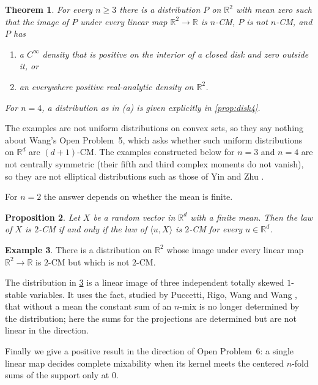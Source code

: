 \documentclass[11pt]{article}
\newtheorem{theorem}{Theorem}[section]
\newtheorem{proposition}[theorem]{Proposition}
\theoremstyle{definition}
\newtheorem{example}[theorem]{Example}
\theoremstyle{remark}
\newcommand{\R}{\mathbb{R}}
\begin{document}
\begin{theorem}\label{thm:regular}
For every $n\ge 3$ there is a distribution $P$ on $\R^2$ with mean zero such that the image of $P$ under every linear
map $\R^2\to\R$ is $n$-CM, $P$ is not $n$-CM, and $P$ has
\begin{enumerate}[label=(\alph*)]
\item a $C^\infty$ density that is positive on the interior of a closed disk and zero outside it, or
\item an everywhere positive real-analytic density on $\R^2$.
\end{enumerate}
For $n=4$, a distribution as in (a) is given explicitly in \cref{prop:disk4}.
\end{theorem}

The examples are not uniform distributions on convex sets, so they say nothing about Wang's Open Problem~5, which
asks whether such uniform distributions on $\R^d$ are $(d+1)$-CM. The examples constructed below for $n=3$ and
$n=4$ are not centrally symmetric (their fifth and third complex moments do not vanish), so they are not elliptical
distributions such as those of Yin and Zhu \cite{YZ}.

For $n=2$ the answer depends on whether the mean is finite.

\begin{proposition}\label{prop:two}
Let $X$ be a random vector in $\R^d$ with a finite mean. Then the law of $X$ is $2$-CM if and only if the law of
$\langle u,X\rangle$ is $2$-CM for every $u\in\R^d$.
\end{proposition}

\begin{example}\label{ex:stable}
There is a distribution on $\R^2$ whose image under every linear map $\R^2\to\R$ is $2$-CM but which is not $2$-CM.
\end{example}

The distribution in \cref{ex:stable} is a linear image of three independent totally skewed $1$-stable variables. It
uses the fact, studied by Puccetti, Rigo, Wang and Wang \cite{PRWW}, that without a mean the constant sum of an $n$-mix is no longer determined by the distribution; here the sums for the projections are
determined but are not linear in the direction.

Finally we give a positive result in the direction of Open Problem~6: a single linear map decides complete
mixability when its kernel meets the centered $n$-fold sums of the support only at $0$.
\end{document}
